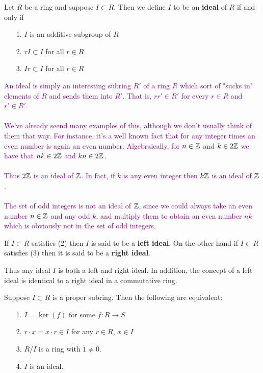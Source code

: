     \begin{definition}
        Let $R$ be a ring and suppose $I \subset R$. Then we
        define $I$ to be an \textbf{ideal} of $R$ if and only if 
        \begin{itemize}
            \item [1.] $I$ is an additive subgroup of $R$ 
            \item [2.] $rI \subset I$ for all $r \in R$ 
            \item [3.] $Ir \subset I$ for all $r \in R$
        \end{itemize}

        \textcolor{Purple}{An ideal is simply an interesting
        subring $R'$ of a ring $R$ which sort of "sucks in"
        elements of $R$ and sends them into $R'$. That is, $rr'
        \in R'$ for every $r \in R$ and $r' \in R'$.
        \\
        \\
        We've already seend many examples of this, although we
        don't usually think of them that way. For instance, it's
        a well known fact that for any integer times an even
        number is again an even number. Algebraically, for $n \in \mathbb{Z}$
        and $k \in 2\mathbb{Z}$ we have that $nk \in 2\mathbb{Z}$ and $kn \in
        2\mathbb{Z}$. 
        \\
        \\
        Thus $2\mathbb{Z}$ is an ideal of $\mathbb{Z}$. In fact, if $k$ is any
        even integer then $k\mathbb{Z}$ is an ideal of $\mathbb{Z}$.
        \\
        \\
        The set of odd integers is not an ideal of $\mathbb{Z}$, since we
        could always take an even number $n \in \mathbb{Z}$ and any odd
        $k$, and multiply them to obtain an even number $nk$ which
        is obviously not in the set of odd integers.
        }


        If $I \subset R$ satisfies (2) then $I$ is
        said to be a \textbf{left ideal}. On the other hand if $I
        \subset R$ satisfies (3) then it is said to be a
        \textbf{right ideal}. 
    \end{definition}

    Thus any ideal $I$ is both a left and right ideal. In
    addition, the concept of a left ideal is identical to a right
    ideal in a commutative ring.  

    \begin{thm} 
        Suppose $I \subset R$ is a proper subring. Then the
        following are equivalent:
        \begin{itemize}
            \item[1.] $I = \ker(f)$ for some $f: R \to S$
            \item[2.] $r\cdot x = x \cdot r \in I$ for any $r \in
            R$, $x \in I$ 
            \item[3.] $R/I$ is a ring with $\overline{1} \ne \overline{0}$. 
            \item[4.] $I$ is an ideal.  
        \end{itemize}
    \end{thm}

